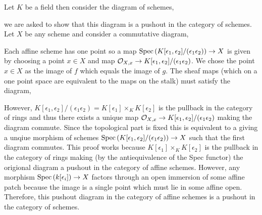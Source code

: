 \documentclass[12pt]{article}
\begin{document}
Let $K$ be a field then consider the diagram of schemes,
\begin{center}
\end{center}
we are asked to show that this diagram is a pushout in the category of schemes. Let $X$ be any scheme and consider a commutative diagram,
\begin{center}
\end{center}
Each affine scheme has one point so a map $\mathrm{Spec}\left( K[\epsilon_1, \epsilon_2]/(\epsilon_1 \epsilon_2) \right) \to X$ is given by choosing a point $x \in X$ and map $\mathcal{O}_{X, x} \to K[\epsilon_1, \epsilon_2]/(\epsilon_1 \epsilon_2)$. We chose the point $x \in X$ as the image of $f$ which equals the image of $g$. The sheaf maps (which on a one point space are equivalent to the maps on the stalk) must satisfy the diagram,
\begin{center}
\end{center}
However, $K[\epsilon_1, \epsilon_2] /(\epsilon_1 \epsilon_2) = K[\epsilon_1] \times_K K[\epsilon_2]$ is the pullback in the category of rings and thus there exists a unique map $\mathcal{O}_{X, x} \to K[\epsilon_1, \epsilon_2] /(\epsilon_1 \epsilon_2)$ making the diagram commute. Since the topological part is fixed this is equivalent to a giving a unqiue morphism of schemes $\mathrm{Spec}\left( K[\epsilon_1, \epsilon_2] /(\epsilon_1 \epsilon_2) \right) \to X$ such that the first diagram commutes. This proof works because  $K[\epsilon_1] \times_K K[\epsilon_2]$ is the pullback in the category of rings making (by the antiequivalence of the Spec functor) the origional diagram a pushout in the category of affine schemes. However, any morphism $\mathrm{Spec}\left( k[\epsilon_i] \right) \to X$ factors through an open immersion of some affine patch because the image is a single point which must lie in some affine open. Therefore, this pushout diagram in the category of affine schemes is a pushout in the category of schemes.  
\end{document}
